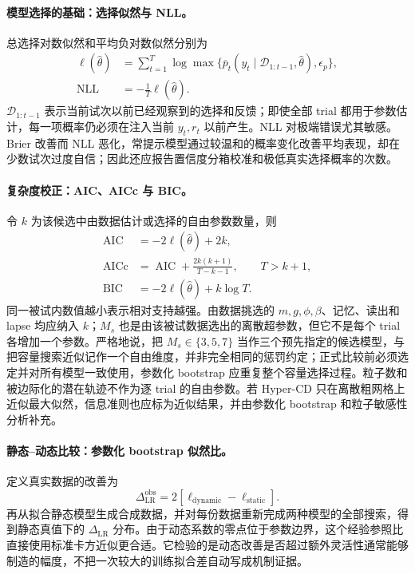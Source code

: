 \paragraph{模型选择的基础：选择似然与 NLL。}
总选择对数似然和平均负对数似然分别为
\begin{align}
\ell(\widehat\theta)
&=\sum_{t=1}^{T}
\log\max\{\overline p_t(y_t\mid\mathcal D_{1:t-1},\widehat\theta),\epsilon_p\},
\nonumber\\
\operatorname{NLL}
&=-\frac{1}{T}\ell(\widehat\theta).
\label{eq:model0809-nll}
\end{align}
$\mathcal D_{1:t-1}$ 表示当前试次以前已经观察到的选择和反馈；即使全部 trial 都用于参数估计，每一项概率仍必须在注入当前 $y_t,r_t$ 以前产生。NLL 对极端错误尤其敏感。Brier 改善而 NLL 恶化，常提示模型通过较温和的概率变化改善平均表现，却在少数试次过度自信；因此还应报告置信度分箱校准和极低真实选择概率的次数。

\paragraph{复杂度校正：AIC、AICc 与 BIC。}
令 $k$ 为该候选中由数据估计或选择的自由参数数量，则
\begin{align}
\operatorname{AIC}
&=-2\ell(\widehat\theta)+2k,
\nonumber\\
\operatorname{AICc}
&=\operatorname{AIC}
+\frac{2k(k+1)}{T-k-1},
\qquad T>k+1,
\nonumber\\
\operatorname{BIC}
&=-2\ell(\widehat\theta)+k\log T.
\label{eq:model0809-information-criteria}
\end{align}
同一被试内数值越小表示相对支持越强。由数据挑选的 $m,g,\phi,\beta$、记忆、读出和 lapse 均应纳入 $k$；$M_s$ 也是由该被试数据选出的离散超参数，但它不是每个 trial 各增加一个参数。严格地说，把 $M_s\in\{3,5,7\}$ 当作三个预先指定的候选模型，与把容量搜索近似记作一个自由维度，并非完全相同的惩罚约定；正式比较前必须选定并对所有模型一致使用，参数化 bootstrap 应重复整个容量选择过程。粒子数和被边际化的潜在轨迹不作为逐 trial 的自由参数。若 Hyper-CD 只在离散粗网格上近似最大似然，信息准则也应标为近似结果，并由参数化 bootstrap 和粒子敏感性分析补充。

\paragraph{静态--动态比较：参数化 bootstrap 似然比。}
定义真实数据的改善为
\begin{equation}
\Delta_{\mathrm{LR}}^{\mathrm{obs}}
=2\left[\ell_{\mathrm{dynamic}}-\ell_{\mathrm{static}}\right].
\label{eq:model0809-likelihood-ratio}
\end{equation}
再从拟合静态模型生成合成数据，并对每份数据重新完成两种模型的全部搜索，得到静态真值下的 $\Delta_{\mathrm{LR}}$ 分布。由于动态系数的零点位于参数边界，这个经验参照比直接使用标准卡方近似更合适。它检验的是动态改善是否超过额外灵活性通常能够制造的幅度，不把一次较大的训练拟合差自动写成机制证据。

